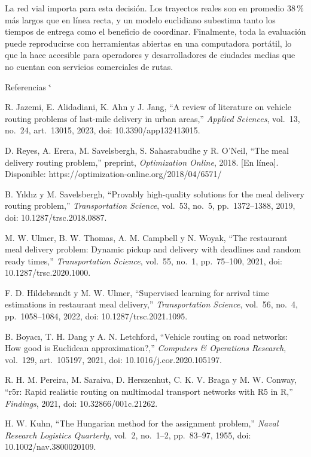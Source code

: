 \documentclass[10pt]{article}
\makeatletter
\renewcommand{\section}{\@startsection{section}{1}{0pt}{8pt}{0.1pt}
  {\semibold\fontsize{12}{14.6}\selectfont\color{riimazul}\raggedright}}
\renewenvironment{thebibliography}[1]{%
  \section{Referencias}
  \list{\@biblabel{\@arabic\c@enumiv}}{%
    \arialfont\fontsize{10}{12}\selectfont
    \settowidth\labelwidth{\@biblabel{#1}}%
    \leftmargin=1.27cm \labelwidth=1.27cm \labelsep=0pt \itemindent=0pt
    \itemsep=0pt \parsep=0pt \topsep=0pt
    \def\makelabel##1{##1\hfil}%
    \usecounter{enumiv}\let\p@enumiv\@empty
    \renewcommand\theenumiv{\@arabic\c@enumiv}}%
  \sloppy\clubpenalty4000\widowpenalty4000\sfcode`\.\@m}
  {\def\@noitemerr{\@latex@warning{Empty `thebibliography' environment}}\endlist}
\makeatother
\begin{document}
La red vial importa para esta decisión. Los trayectos reales son en promedio 38\,\% más largos que
en línea recta, y un modelo euclidiano subestima tanto los tiempos de entrega como el beneficio de
coordinar. Finalmente, toda la evaluación puede reproducirse con herramientas abiertas en una
computadora portátil, lo que la hace accesible para operadores y desarrolladores de ciudades medias
que no cuentan con servicios comerciales de rutas.

\begin{thebibliography}{99}

R. Jazemi, E. Alidadiani, K. Ahn y J. Jang, ``A review of literature on vehicle routing problems of
last-mile delivery in urban areas,'' \textit{Applied Sciences}, vol.~13, no.~24, art.~13015, 2023,
doi: 10.3390/app132413015.

D. Reyes, A. Erera, M. Savelsbergh, S. Sahasrabudhe y R. O'Neil, ``The meal delivery routing
problem,'' preprint, \textit{Optimization Online}, 2018. [En línea]. Disponible:
https://optimization-online.org/2018/04/6571/

B. Yıldız y M. Savelsbergh, ``Provably high-quality solutions for the meal delivery routing
problem,'' \textit{Transportation Science}, vol.~53, no.~5, pp.~1372--1388, 2019,
doi: 10.1287/trsc.2018.0887.

M. W. Ulmer, B. W. Thomas, A. M. Campbell y N. Woyak, ``The restaurant meal delivery problem: Dynamic
pickup and delivery with deadlines and random ready times,'' \textit{Transportation Science},
vol.~55, no.~1, pp.~75--100, 2021, doi: 10.1287/trsc.2020.1000.

F. D. Hildebrandt y M. W. Ulmer, ``Supervised learning for arrival time estimations in restaurant
meal delivery,'' \textit{Transportation Science}, vol.~56, no.~4, pp.~1058--1084, 2022,
doi: 10.1287/trsc.2021.1095.

B. Boyacı, T. H. Dang y A. N. Letchford, ``Vehicle routing on road networks: How good is Euclidean
approximation?,'' \textit{Computers \& Operations Research}, vol.~129, art.~105197, 2021,
doi: 10.1016/j.cor.2020.105197.

R. H. M. Pereira, M. Saraiva, D. Herszenhut, C. K. V. Braga y M. W. Conway, ``r5r: Rapid realistic
routing on multimodal transport networks with R5 in R,'' \textit{Findings}, 2021,
doi: 10.32866/001c.21262.

H. W. Kuhn, ``The Hungarian method for the assignment problem,'' \textit{Naval Research Logistics
Quarterly}, vol.~2, no.~1--2, pp.~83--97, 1955, doi: 10.1002/nav.3800020109.


\end{thebibliography}
\end{document}
